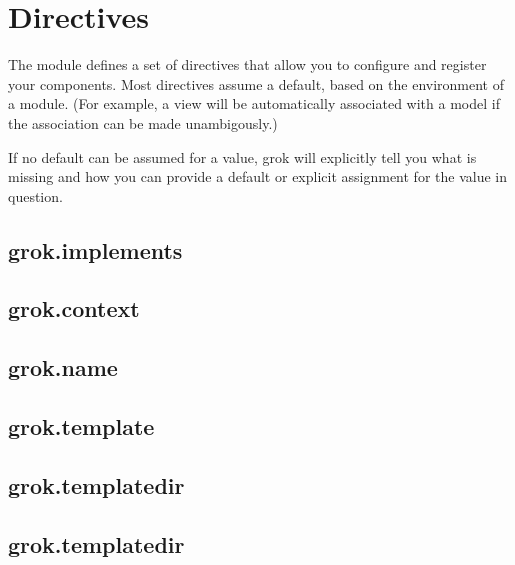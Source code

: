 \chapter{Directives}

The  module defines a set of directives that allow you to
configure and register your components. Most directives assume a default, based
on the environment of a module. (For example, a view will be automatically
associated with a model if the association can be made unambigously.) 

If no default can be assumed for a value, grok will explicitly tell you what is
missing and how you can provide a default or explicit assignment for the value
in question.

    \section{grok.implements}

    \section{grok.context}

    \section{grok.name}

    \section{grok.template}

    \section{grok.templatedir}

    \section{grok.templatedir}

